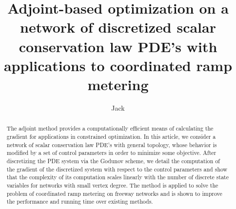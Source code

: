 \documentclass[english]{article}
\theoremstyle{plain}
\theoremstyle{definition}
\theoremstyle{remark}
\theoremstyle{remark}
\theoremstyle{plain}
\begin{document}
\title{Adjoint-based optimization on a network of discretized scalar conservation
law PDE's with applications to coordinated ramp metering}


\author{Jack}
\maketitle
\begin{abstract}
The adjoint method provides a computationally efficient means of calculating
the gradient for applications in constrained optimization. In this
article, we consider a network of scalar conservation law PDE's with
general topology, whose behavior is modified by a set of control parameters
in order to minimize some objective. After discretizing the PDE system
via the Godunov scheme, we detail the computation of the gradient
of the discretized system with respect to the control parameters and
show that the complexity of its computation scales linearly with the
number of discrete state variables for networks with small vertex
degree. The method is applied to solve the problem of coordinated
ramp metering on freeway networks and is shown to improve the performance
and running time over existing methods.
\end{abstract}




\end{document}
